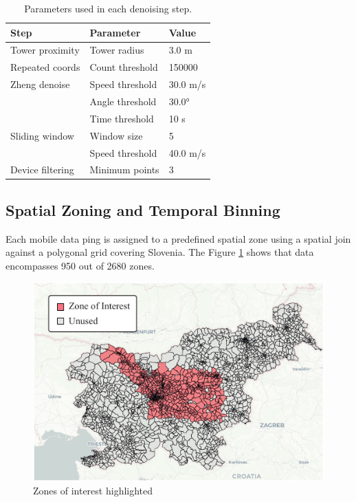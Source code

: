 \documentclass[fleqn,moreauthors,10pt]{ds_report}
\begin{document}
\begin{table}[hbt]
    \caption{Parameters used in each denoising step.}
    \centering
    \renewcommand{\arraystretch}{1.2} %
    \begin{tabular}{lll}
        \hline
        \textbf{Step} & \textbf{Parameter} & \textbf{Value} \\
        \hline
        Tower proximity  & Tower radius       & 3.0 m \\
        Repeated coords  & Count threshold    & 150000 \\
        Zheng denoise    & Speed threshold    & 30.0 m/s \\
                         & Angle threshold    & 30.0° \\
                         & Time threshold     & 10 s \\
        Sliding window   & Window size        & 5 \\
                         & Speed threshold    & 40.0 m/s \\
        Device filtering & Minimum points     & 3 \\
        \hline
    \end{tabular}
    \label{tab:denoise_params}
\end{table}



\subsection*{Spatial Zoning and Temporal Binning}

Each mobile data ping is assigned to a predefined spatial zone using a spatial join against a polygonal grid covering Slovenia. The Figure \ref{fig:bins} shows that data encompasses 950 out of 2680 zones.

\begin{figure}[hbt]\centering
	\includegraphics[width=\linewidth]{fig/binned.pdf}
	\caption{Zones of interest highlighted}
	\label{fig:bins}
\end{figure}
\end{document}

